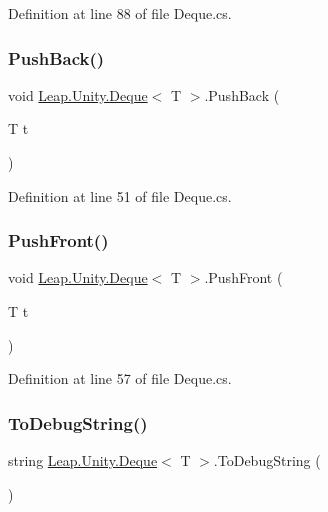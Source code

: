 Definition at line 88 of file Deque.\+cs.

\mbox{\label{class_leap_1_1_unity_1_1_deque_a4ee63cee34a27e19b6631b07b918103f}} 
\subsubsection{\texorpdfstring{PushBack()}{PushBack()}}
{\footnotesize\ttfamily void \mbox{\hyperlink{class_leap_1_1_unity_1_1_deque}{Leap.\+Unity.\+Deque}}$<$ T $>$.Push\+Back (\begin{DoxyParamCaption}\item[{T}]{t }\end{DoxyParamCaption})}



Definition at line 51 of file Deque.\+cs.

\mbox{\label{class_leap_1_1_unity_1_1_deque_ad138b4500ea49069cf1ca653124b42ec}} 
\subsubsection{\texorpdfstring{PushFront()}{PushFront()}}
{\footnotesize\ttfamily void \mbox{\hyperlink{class_leap_1_1_unity_1_1_deque}{Leap.\+Unity.\+Deque}}$<$ T $>$.Push\+Front (\begin{DoxyParamCaption}\item[{T}]{t }\end{DoxyParamCaption})}



Definition at line 57 of file Deque.\+cs.

\mbox{\label{class_leap_1_1_unity_1_1_deque_a2b65e86dacf65e14275e49d76737caab}} 
\subsubsection{\texorpdfstring{ToDebugString()}{ToDebugString()}}
{\footnotesize\ttfamily string \mbox{\hyperlink{class_leap_1_1_unity_1_1_deque}{Leap.\+Unity.\+Deque}}$<$ T $>$.To\+Debug\+String (\begin{DoxyParamCaption}{ }\end{DoxyParamCaption})}



